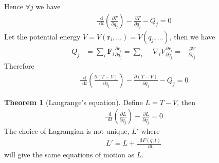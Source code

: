 \documentclass[twoside,11pt]{article}
\numberwithin{equation}{section} %
\newcommand{\lms}{\fontfamily{lmss}\selectfont} %
\renewcommand*\d{\mathop{}\!\mathrm{d}}
\theoremstyle{definition}
\newtheorem{theorem}{\lms Theorem}[section]
\theoremstyle{remark}
\begin{document}
Hence $\forall j$ we have
\begin{align}
    \frac{\d }{\d t}\left(\frac{\partial T}{\partial\dot{q}_j}\right)
    - \frac{\partial T}{\partial q_j}
    - Q_j = 0
    \label{lag0}
\end{align}
Let the potential energy $V=V(\mathbf{r}_i,\dots)=V(q_j,\dots)$,
then we have
\begin{align}
    Q_j &= \sum_i\mathbf{F}_i\frac{\partial\mathbf{r}_i}{\partial q_j}
    = \sum_i -\nabla_i V\frac{\partial\mathbf{r}_i}{\partial q_j}
    = -\frac{\partial V}{\partial q_j}
\end{align}
Therefore
\begin{align}
    \frac{\d }{\d t}\left(\frac{\partial (T-V)}{\partial\dot{q}_j}\right)
    - \frac{\partial (T-V)}{\partial q_j}
    - Q_j = 0
\end{align}
\begin{theorem}[Langrange's equation]
Define $L=T-V$, then
\begin{align}
    \frac{\d }{\d t}\left(\frac{\partial L}{\partial\dot{q}_j}\right)
    - \frac{\partial L}{\partial q_j}
    = 0
\end{align}
The choice of Lagrangian is not unique, $L'$ where
\begin{align}
    L' = L + \frac{\d F(q, t)}{\d t}
\end{align}
will give the same equations of motion as $L$.
\end{theorem}
\end{document}

